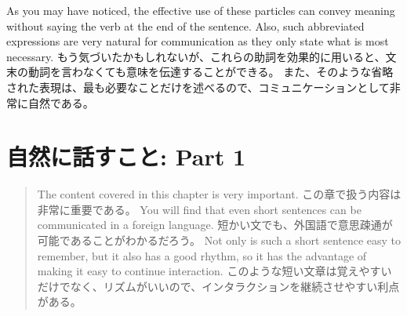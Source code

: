 \documentclass[uplatex,dvipdfmx,b5paper,english,10pt]{jsbook}
\newif\ifNATURALSPEAKINGPARTONE
\begin{document}
\ifEnglish
As you may have noticed, the effective use of these particles can convey meaning without saying the verb at the end of the sentence.
Also, such abbreviated expressions are very natural for communication as they only state what is most necessary.
\else
もう気づいたかもしれないが、これらの助詞を効果的に用いると、文末の動詞を言わなくても意味を伝達することができる。
また、そのような省略された表現は、最も必要なことだけを述べるので、コミュニケーションとして非常に自然である。
\fi
%
%
%

\fi%

\ifNATURALSPEAKINGPARTONE
\ifEnglish
\chapter{Natural Speaking: Part 1}
\else
\chapter{自然に話すこと: Part 1}
\fi

\begin{abstract}

\ifEnglish
The content covered in this chapter is very important.
\else
この章で扱う内容は非常に重要である。
\fi
\ifEnglish
You will find that even short sentences can be communicated in a foreign language.
\else
短かい文でも、外国語で意思疎通が可能であることがわかるだろう。
\fi
\ifEnglish
Not only is such a short sentence easy to remember, but it also has a good rhythm, so it has the advantage of making it easy to continue interaction.
\else
このような短い文章は覚えやすいだけでなく、リズムがいいので、インタラクションを継続させやすい利点がある。
\fi
\end{abstract}
\end{document}
